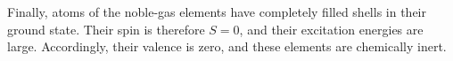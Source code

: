 Finally, atoms of the noble-gas elements have completely filled shells in their ground state. Their spin is therefore $S=0$, and their excitation energies are large. Accordingly, their valence is zero, and these elements are chemically inert.
